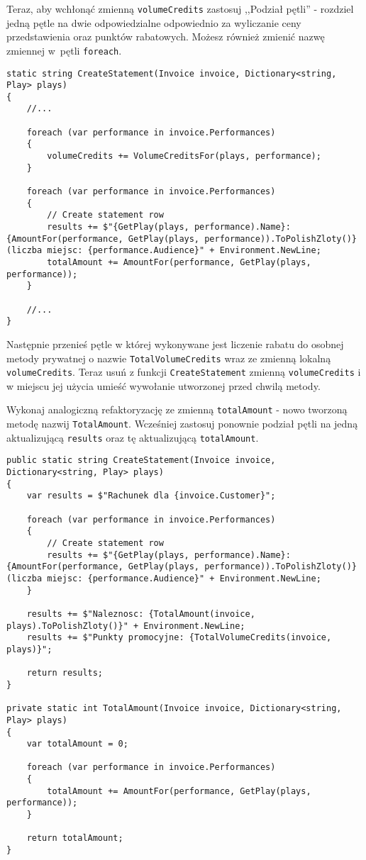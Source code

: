 Teraz, aby wchłonąć zmienną \texttt{volumeCredits} zastosuj ,,Podział pętli'' - rozdziel jedną pętle na dwie odpowiedzialne odpowiednio za wyliczanie ceny przedstawienia oraz punktów rabatowych. Możesz również zmienić nazwę zmiennej w~pętli \texttt{foreach}.
\begin{lstlisting}
static string CreateStatement(Invoice invoice, Dictionary<string, Play> plays)
{
	//...	
		
	foreach (var performance in invoice.Performances)
	{
		volumeCredits += VolumeCreditsFor(plays, performance);
	}
	
	foreach (var performance in invoice.Performances)
	{
		// Create statement row
		results += $"{GetPlay(plays, performance).Name}: {AmountFor(performance, GetPlay(plays, performance)).ToPolishZloty()} (liczba miejsc: {performance.Audience}" + Environment.NewLine;
		totalAmount += AmountFor(performance, GetPlay(plays, performance));
	}
	
	//...
}
\end{lstlisting}
Następnie przenieś pętle w której wykonywane jest liczenie rabatu do osobnej metody prywatnej o nazwie \texttt{TotalVolumeCredits} wraz ze zmienną lokalną \texttt{volumeCredits}. Teraz usuń z funkcji \texttt{CreateStatement} zmienną \texttt{volumeCredits} i w miejscu jej użycia umieść wywołanie utworzonej przed chwilą metody. 

Wykonaj analogiczną refaktoryzację ze zmienną \texttt{totalAmount} - nowo tworzoną metodę nazwij \texttt{TotalAmount}. Wcześniej zastosuj ponownie podział pętli na jedną aktualizującą \texttt{results} oraz tę aktualizującą \texttt{totalAmount}.
\begin{lstlisting}
public static string CreateStatement(Invoice invoice, Dictionary<string, Play> plays)
{
	var results = $"Rachunek dla {invoice.Customer}";
	
	foreach (var performance in invoice.Performances)
	{
		// Create statement row
		results += $"{GetPlay(plays, performance).Name}: {AmountFor(performance, GetPlay(plays, performance)).ToPolishZloty()} (liczba miejsc: {performance.Audience}" + Environment.NewLine;
	}
	
	results += $"Naleznosc: {TotalAmount(invoice, plays).ToPolishZloty()}" + Environment.NewLine;
	results += $"Punkty promocyjne: {TotalVolumeCredits(invoice, plays)}";
	
	return results;
}

private static int TotalAmount(Invoice invoice, Dictionary<string, Play> plays)
{
	var totalAmount = 0;
	
	foreach (var performance in invoice.Performances)
	{
		totalAmount += AmountFor(performance, GetPlay(plays, performance));
	}
	
	return totalAmount;
}
\end{lstlisting}


